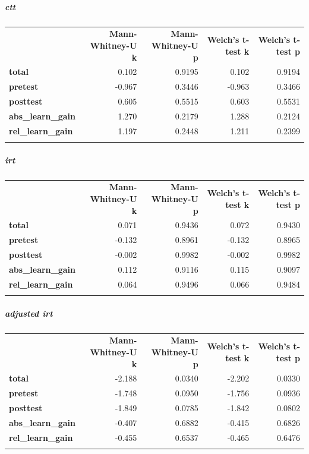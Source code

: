 \documentclass[]{article}
\begin{document}
\FloatBarrier
\subparagraph{ctt}\label{ctt-1}

\begin{longtable}[c]{@{}lrrrr@{}}
\toprule\addlinespace
& \textbf{Mann-Whitney-U k} & \textbf{Mann-Whitney-U p} &
\textbf{Welch's t-test k} & \textbf{Welch's t-test p}
\\\addlinespace
\midrule\endhead
\textbf{total} & 0.102 & 0.9195 & 0.102 & 0.9194
\\\addlinespace
\textbf{pretest} & -0.967 & 0.3446 & -0.963 & 0.3466
\\\addlinespace
\textbf{posttest} & 0.605 & 0.5515 & 0.603 & 0.5531
\\\addlinespace
\textbf{abs\_learn\_gain} & 1.270 & 0.2179 & 1.288 & 0.2124
\\\addlinespace
\textbf{rel\_learn\_gain} & 1.197 & 0.2448 & 1.211 & 0.2399
\\\addlinespace
\bottomrule
\end{longtable}

\FloatBarrier
\subparagraph{irt}\label{irt-1}

\begin{longtable}[c]{@{}lrrrr@{}}
\toprule\addlinespace
& \textbf{Mann-Whitney-U k} & \textbf{Mann-Whitney-U p} &
\textbf{Welch's t-test k} & \textbf{Welch's t-test p}
\\\addlinespace
\midrule\endhead
\textbf{total} & 0.071 & 0.9436 & 0.072 & 0.9430
\\\addlinespace
\textbf{pretest} & -0.132 & 0.8961 & -0.132 & 0.8965
\\\addlinespace
\textbf{posttest} & -0.002 & 0.9982 & -0.002 & 0.9982
\\\addlinespace
\textbf{abs\_learn\_gain} & 0.112 & 0.9116 & 0.115 & 0.9097
\\\addlinespace
\textbf{rel\_learn\_gain} & 0.064 & 0.9496 & 0.066 & 0.9484
\\\addlinespace
\bottomrule
\end{longtable}

\FloatBarrier
\subparagraph{adjusted irt}\label{adjusted-irt-1}

\begin{longtable}[c]{@{}lrrrr@{}}
\toprule\addlinespace
& \textbf{Mann-Whitney-U k} & \textbf{Mann-Whitney-U p} &
\textbf{Welch's t-test k} & \textbf{Welch's t-test p}
\\\addlinespace
\midrule\endhead
\textbf{total} & -2.188 & 0.0340 & -2.202 & 0.0330
\\\addlinespace
\textbf{pretest} & -1.748 & 0.0950 & -1.756 & 0.0936
\\\addlinespace
\textbf{posttest} & -1.849 & 0.0785 & -1.842 & 0.0802
\\\addlinespace
\textbf{abs\_learn\_gain} & -0.407 & 0.6882 & -0.415 & 0.6826
\\\addlinespace
\textbf{rel\_learn\_gain} & -0.455 & 0.6537 & -0.465 & 0.6476
\\\addlinespace
\bottomrule
\end{longtable}
\end{document}
